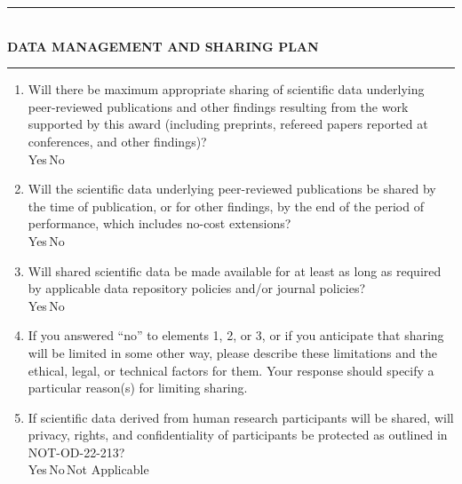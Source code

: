 \documentclass[11pt]{article}
\newcommand{\chk}{\raisebox{-1pt}{$\boxtimes$}}
\newcommand{\unchk}{\raisebox{-1pt}{$\square$}}
\begin{document}
\begin{center}
\rule{\textwidth}{0.4pt}\\[.5em]
\textbf{\uppercase{Data Management and Sharing Plan}}\\[.5em]
\rule{\textwidth}{0.4pt}
\end{center}

\begin{enumerate}[leftmargin=2em, itemsep=.8em]

\item Will there be maximum appropriate sharing of scientific data underlying peer-reviewed publications and other findings resulting from the work supported by this award (including preprints, refereed papers reported at conferences, and other findings)?\\[.2em]
Yes\,\chk\quad No\,\unchk

\item Will the scientific data underlying peer-reviewed publications be shared by the time of publication, or for other findings, by the end of the period of performance, which includes no-cost extensions?\\[.2em]
Yes\,\chk\quad No\,\unchk

\item Will shared scientific data be made available for at least as long as required by applicable data repository policies and/or journal policies?\\[.2em]
Yes\,\chk\quad No\,\unchk

\item If you answered ``no'' to elements 1, 2, or 3, or if you anticipate that sharing will be limited in some other way, please describe these limitations and the ethical, legal, or technical factors for them. Your response should specify a particular reason(s) for limiting sharing.

\item If scientific data derived from human research participants will be shared, will privacy, rights, and confidentiality of participants be protected as outlined in NOT-OD-22-213?\\[.2em]
Yes\,\chk\quad No\,\unchk\quad Not Applicable\,\unchk


\end{enumerate}
\end{document}
